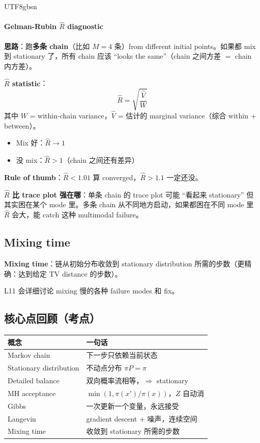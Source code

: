 \documentclass[11pt]{article}
\begin{document}
\begin{CJK}{UTF8}{gbsn}
\paragraph{Gelman-Rubin $\hat R$ diagnostic}

\textbf{思路}：跑\textbf{多条 chain}（比如 $M = 4$ 条）from different initial points。如果都 mix 到 stationary 了，所有 chain 应该 ``looks the same''（chain 之间方差 $=$ chain 内方差）。

\textbf{$\hat R$ statistic}：
\[
\hat R = \sqrt{\frac{\hat V}{W}}
\]
其中 $W$ = within-chain variance，$\hat V$ = 估计的 marginal variance（综合 within + between）。
\begin{itemize}[nosep]
  \item Mix 好：$\hat R \to 1$
  \item 没 mix：$\hat R > 1$（chain 之间还有差异）
\end{itemize}

\textbf{Rule of thumb}：$\hat R < 1.01$ 算 converged，$\hat R > 1.1$ 一定还没。

\textbf{$\hat R$ 比 trace plot 强在哪}：单条 chain 的 trace plot 可能 ``看起来 stationary'' 但其实困在某个 mode 里。多条 chain 从不同地方启动，如果都困在不同 mode 里 $\hat R$ 会大，能 catch 这种 multimodal failure。

\subsection{Mixing time}

\textbf{Mixing time}：链从初始分布收敛到 stationary distribution 所需的步数（更精确：达到给定 TV distance 的步数）。

L11 会详细讨论 mixing 慢的各种 failure modes 和 fix。

\subsection{核心点回顾（考点）}

\begin{center}
\begin{tabular}{|l|l|}
\hline
概念 & 一句话 \\
\hline
Markov chain & 下一步只依赖当前状态 \\
Stationary distribution & 不动点分布 $\pi P = \pi$ \\
Detailed balance & 双向概率流相等，$\Rightarrow$ stationary \\
MH acceptance & $\min(1, \pi(x')/\pi(x))$，$Z$ 自动消 \\
Gibbs & 一次更新一个变量，永远接受 \\
Langevin & gradient descent + 噪声，连续空间 \\
Mixing time & 收敛到 stationary 所需的步数 \\
\hline
\end{tabular}
\end{center}


\end{CJK}
\end{document}
